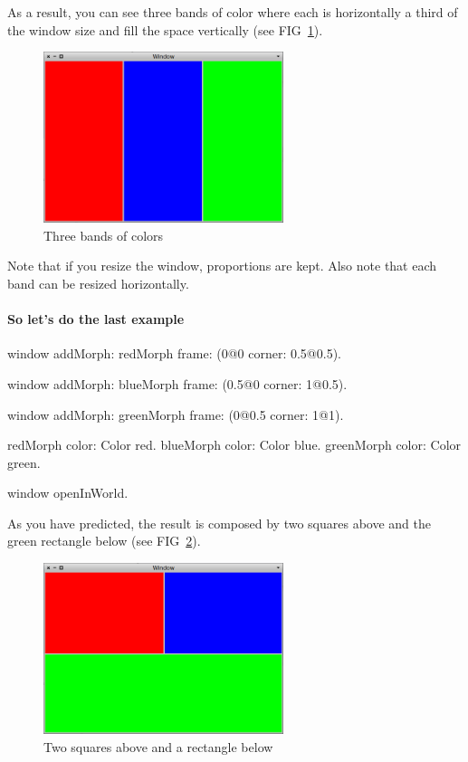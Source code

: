 \documentclass[a4paper,10pt,twoside]{book}
\begin{document}
As a result, you can see three bands of color where each is horizontally a third of the window size and fill the space vertically (see FIG~\ref{fig:simpleLayoutExample2}).

\begin{figure}[ht]\centering
	\includegraphics[width=7cm]{SimpleLayoutExample2}
	\caption{Three bands of colors}
	\label{fig:simpleLayoutExample2}
\end{figure}

Note that if you resize the window, proportions are kept.
Also note that each band can be resized horizontally.

\paragraph{So let's do the last example}

\begin{code}{}
window
	addMorph: redMorph
	frame: (0@0 corner: 0.5@0.5).

window
	addMorph: blueMorph
	frame: (0.5@0 corner: 1@0.5).

window
	addMorph: greenMorph
	frame: (0@0.5 corner: 1@1).

redMorph color: Color red.
blueMorph color: Color blue.
greenMorph color: Color green.
	
window openInWorld.
\end{code}

As you have predicted, the result is composed by two squares above and the green rectangle below (see FIG~\ref{fig:simpleLayoutExample3}).

\begin{figure}[ht]\centering
	\includegraphics[width=7cm]{SimpleLayoutExample3}
	\caption{Two squares above and a rectangle below}
	\label{fig:simpleLayoutExample3}
\end{figure}
\end{document}

